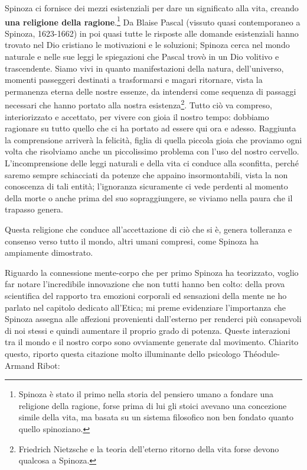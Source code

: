 Spinoza ci fornisce dei mezzi esistenziali per dare un significato alla vita, creando \textbf{una religione della ragione}.\footnote{Spinoza è stato il primo nella storia del pensiero umano a fondare una religione della ragione, forse prima di lui gli stoici avevano una concezione simile della vita, ma basata su un sistema filosofico non ben fondato quanto quello spinoziano.} Da Blaise Pascal (vissuto quasi contemporaneo a Spinoza, 1623-1662) in poi quasi tutte le risposte alle domande esistenziali hanno trovato nel Dio cristiano le motivazioni e le soluzioni; Spinoza cerca nel mondo naturale e nelle sue leggi le spiegazioni che Pascal trovò in un Dio volitivo e trascendente. Siamo vivi in quanto manifestazioni della natura, dell'universo, momenti passeggeri destinati a trasformarsi e magari ritornare, vista la permanenza eterna delle nostre essenze, da intendersi come sequenza di passaggi necessari che hanno portato alla nostra esistenza\footnote{Friedrich Nietzsche e la teoria dell'eterno ritorno della vita forse devono qualcosa a Spinoza.}. Tutto ciò va compreso, interiorizzato e accettato, per vivere con gioia il nostro tempo: dobbiamo ragionare su tutto quello che ci ha portato ad essere qui ora e adesso. Raggiunta la comprensione arriverà la felicità, figlia di quella piccola gioia che proviamo ogni volta che risolviamo anche un piccolissimo problema con l'uso del nostro cervello. L'incomprensione delle leggi naturali e della vita ci conduce alla sconfitta, perché saremo sempre schiacciati da potenze che appaino insormontabili, vista la non conoscenza di tali entità; l'ignoranza sicuramente ci vede perdenti al momento della morte o anche prima del suo sopraggiungere, se viviamo nella paura che il trapasso genera. 

Questa religione che conduce  all'accettazione di ciò che si è, genera tolleranza e consenso verso tutto il mondo, altri umani compresi, come Spinoza ha ampiamente dimostrato.

Riguardo la connessione mente-corpo che per primo Spinoza ha teorizzato, voglio far notare l'incredibile innovazione che non tutti hanno ben colto: della prova scientifica del rapporto tra emozioni corporali ed sensazioni della mente ne ho parlato nel capitolo dedicato all'Etica; mi preme evidenziare l'importanza che Spinoza assegna alle affezioni provenienti dall'esterno per renderci più consapevoli di noi stessi e quindi aumentare il proprio grado di potenza. Queste interazioni tra il mondo e il nostro corpo sono ovviamente generate dal movimento. Chiarito questo, riporto questa citazione molto illuminante dello psicologo Théodule-Armand Ribot: 

